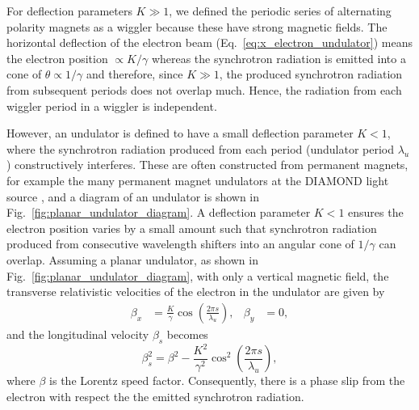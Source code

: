 \documentclass[../main.tex]{subfiles}
\begin{document}
For deflection parameters $K \gg 1$, we defined the periodic series of alternating polarity magnets as a wiggler because these have strong magnetic fields. The horizontal deflection of the electron beam (Eq.~\ref{eq:x_electron_undulator}) means the electron position $\propto K/\gamma$ whereas the synchrotron radiation is emitted into a cone of $\theta \propto 1/\gamma$ and therefore, since $K \gg 1$, the produced synchrotron radiation from subsequent periods does not overlap much. Hence, the radiation from each wiggler period in a wiggler is independent.

However, an undulator is defined to have a small deflection parameter $K < 1$, where the synchrotron radiation produced from each period (undulator period $\lambda_{u}$) constructively interferes. These are often constructed from permanent magnets, for example the many permanent magnet undulators at the DIAMOND light source \cite{materlik2015diamond}, and a diagram of an undulator is shown in Fig.~\ref{fig:planar_undulator_diagram}. A deflection parameter $K < 1$ ensures the electron position varies by a small amount such that synchrotron radiation produced from consecutive wavelength shifters into an angular cone of $1/\gamma$ can overlap. Assuming a planar undulator, as shown in Fig.~\ref{fig:planar_undulator_diagram}, with only a vertical magnetic field, the transverse relativistic velocities of the electron in the undulator are given by
\begin{align}
\beta_{x} &= \frac{K}{\gamma}\cos\left(\frac{2\pi s}{\lambda_{u}}\right), & \beta_{y} &= 0,
\label{eq:transverse_undulator_velocity}    
\end{align}
and the longitudinal velocity $\beta_{s}$ becomes
\begin{equation}
\beta_{s}^{2} = \beta^{2}-\frac{K^{2}}{\gamma^{2}}\cos^{2}\left(\frac{2\pi s}{\lambda_{u}}\right),
\label{eq:longitudinal_undulator_velocity}
\end{equation}
where $\beta$ is the Lorentz speed factor. Consequently, there is a phase slip from the electron with respect the the emitted synchrotron radiation.
\end{document}
